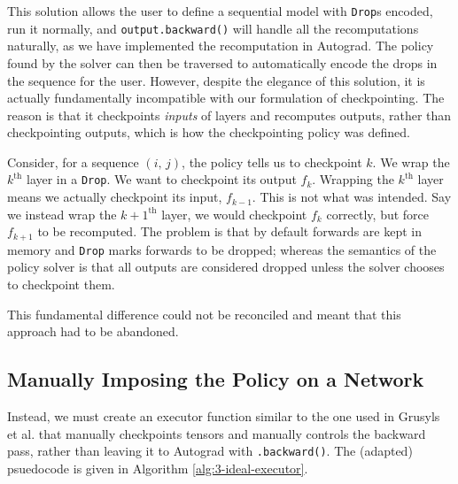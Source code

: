 This solution allows the user to define a sequential model with \texttt{Drop}s encoded, run it normally, and \texttt{output.backward()} will handle all the recomputations naturally, as we have implemented the recomputation in Autograd.
The policy found by the solver can then be traversed to automatically encode the drops in the sequence for the user.
However, despite the elegance of this solution, it is actually fundamentally incompatible with our formulation of checkpointing.
The reason is that it checkpoints \textit{inputs} of layers and recomputes outputs, rather than checkpointing outputs, which is how the checkpointing policy was defined.

Consider, for a sequence \((i,\,j)\), the policy tells us to checkpoint \(k\).
We wrap the \(k^{\mathrm{th}}\) layer in a \texttt{Drop}.
We want to checkpoint its output \(f_k\).
Wrapping the \(k^{\mathrm{th}}\) layer means we actually checkpoint its input, \(f_{k-1}\).
This is not what was intended.
Say we instead wrap the \({k+1}^{\mathrm{th}}\) layer, we would checkpoint \(f_{k}\) correctly, but force \(f_{k+1}\) to be recomputed.
The problem is that by default forwards are kept in memory and \texttt{Drop} marks forwards to be dropped;
whereas the semantics of the policy solver is that all outputs are considered dropped unless the solver chooses to checkpoint them.

This fundamental difference could not be reconciled and meant that this approach had to be abandoned.

\subsection{Manually Imposing the Policy on a Network}
Instead, we must create an executor function similar to the one used in Grusyls et al. \cite[Algorithm~2]{Gruslys2016} that manually checkpoints tensors and manually controls the backward pass, rather than leaving it to Autograd with \texttt{.backward()}.
The (adapted) psuedocode is given in Algorithm \ref{alg:3-ideal-executor}.

